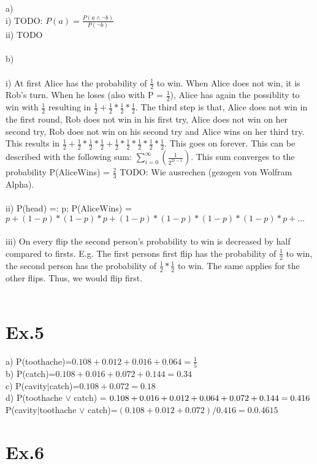 \documentclass[11pt]{article}
\begin{document}
a)\\
i) TODO: $P(a) = \frac{P(a \wedge \neg b)}{P(\neg b)} $\\
ii) TODO\\
\\
b)\\
\\
i) At first Alice has the probability of $\frac{1}{2}$ to win. When Alice does not win, it is Rob's turn. When he loses (also with P = $\frac{1}{2}$), Alice has again the possiblity to win with $\frac{1}{2}$ resulting in $\frac{1}{2}+\frac{1}{2}*\frac{1}{2}*\frac{1}{2}$. The third step is that, Alice does not win in the first round, Rob does not win in his first try, Alice does not win on her second try, Rob does not win on his second try and Alice wins on her third try. This results in $\frac{1}{2}+\frac{1}{2}*\frac{1}{2}*\frac{1}{2}+\frac{1}{2}*\frac{1}{2}*\frac{1}{2}*\frac{1}{2}*\frac{1}{2}$. This goes on forever. This can be described with the following sum: $ \sum\nolimits_{i=0}^\infty(\frac{1}{2^{2i-1}})$. This sum converges to the probability P(AliceWins) = $\frac{2}{3}$ TODO: Wie ausrechen (gezogen von Wolfram Alpha).\\
\\
ii) P(head) =: p; P(AliceWins) = $p + (1-p) *(1-p) * p + (1-p) * (1-p) * (1-p) * (1-p) *p + \dots$ \\
\\
iii) On every flip the second person's probability to win is decreased by half compared to firsts. E.g. The first persons first flip has the probability of $\frac{1}{2}$ to win, the second person has the probability of $\frac{1}{2}*\frac{1}{2}$ to win. The same applies for the other flips. Thus, we would flip first.\\
\\
\section*{Ex.5}
a) P(toothache)=$0.108+0.012+0.016+0.064=\frac{1}{5}$\\
b) P(catch)=$0.108+0.016+0.072+0.144=0.34$\\
c) P(cavity$|$catch)=$0.108+0.072=0.18$\\
d) P(toothache $\vee$ catch) = $0.108+0.016+0.012+0.064+0.072+0.144=0.416\\
$P(cavity$|$toothache $\vee$ catch)=$(0.108+0.012+0.072)/0.416=0.0.4615$\\

\section*{Ex.6}
\end{document}
